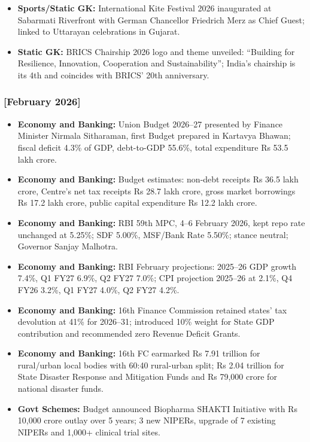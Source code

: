 \documentclass[10pt,a4paper]{article}
\newcommand{\monthtag}[1]{\textbf{[#1]}}
\begin{document}
\begin{itemize}
    \item \textbf{Sports/Static GK:} International Kite Festival 2026 inaugurated at Sabarmati Riverfront with German Chancellor Friedrich Merz as Chief Guest; linked to Uttarayan celebrations in Gujarat.
    \item \textbf{Static GK:} BRICS Chairship 2026 logo and theme unveiled: ``Building for Resilience, Innovation, Cooperation and Sustainability''; India's chairship is its 4th and coincides with BRICS' 20th anniversary.
\end{itemize}

\subsubsection{\monthtag{February 2026}}
\begin{itemize}
    \item \textbf{Economy and Banking:} Union Budget 2026--27 presented by Finance Minister Nirmala Sitharaman, first Budget prepared in Kartavya Bhawan; fiscal deficit 4.3\% of GDP, debt-to-GDP 55.6\%, total expenditure Rs 53.5 lakh crore.
    \item \textbf{Economy and Banking:} Budget estimates: non-debt receipts Rs 36.5 lakh crore, Centre's net tax receipts Rs 28.7 lakh crore, gross market borrowings Rs 17.2 lakh crore, public capital expenditure Rs 12.2 lakh crore.
    \item \textbf{Economy and Banking:} RBI 59th MPC, 4--6 February 2026, kept repo rate unchanged at 5.25\%; SDF 5.00\%, MSF/Bank Rate 5.50\%; stance neutral; Governor Sanjay Malhotra.
    \item \textbf{Economy and Banking:} RBI February projections: 2025--26 GDP growth 7.4\%, Q1 FY27 6.9\%, Q2 FY27 7.0\%; CPI projection 2025--26 at 2.1\%, Q4 FY26 3.2\%, Q1 FY27 4.0\%, Q2 FY27 4.2\%.
    \item \textbf{Economy and Banking:} 16th Finance Commission retained states' tax devolution at 41\% for 2026--31; introduced 10\% weight for State GDP contribution and recommended zero Revenue Deficit Grants.
    \item \textbf{Economy and Banking:} 16th FC earmarked Rs 7.91 trillion for rural/urban local bodies with 60:40 rural-urban split; Rs 2.04 trillion for State Disaster Response and Mitigation Funds and Rs 79,000 crore for national disaster funds.
    \item \textbf{Govt Schemes:} Budget announced Biopharma SHAKTI Initiative with Rs 10,000 crore outlay over 5 years; 3 new NIPERs, upgrade of 7 existing NIPERs and 1,000+ clinical trial sites.

\end{itemize}
\end{document}
